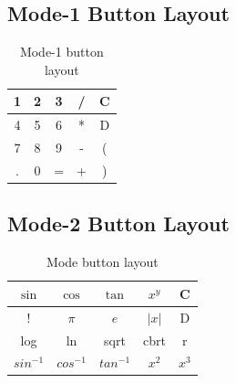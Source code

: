 \documentclass[a4paper,12pt]{article}
\begin{document}
\subsection{Mode-1 Button Layout}
\begin{table}[h]
    \centering
    \begin{tabular}{|c|c|c|c|c|}
        \hline
        1 & 2 & 3 & / & C \\
        \hline
        4 & 5 & 6 & * & D \\
        \hline
        7 & 8 & 9 & - & ( \\
        \hline
               . & 0 & = & + & ) \\
        \hline
    \end{tabular}
    \caption{Mode-1 button layout}
    \label{tab:normal_buttons}
\end{table}

\subsection{Mode-2 Button Layout}
\begin{table}[h]
    \centering
    \begin{tabular}{|c|c|c|c|c|}
        \hline
        $\sin$ & $\cos$ & $\tan$ & $x^y$ & C \\
        \hline
        ! & $\pi$ & $e$ & $|x|$ & D \\
        \hline
        log & ln & sqrt & cbrt & r \\
        \hline
        $sin^{-1}$ & $cos^{-1}$ & $tan^{-1}$ & $x^2$ & $x^3$ \\
        \hline
    \end{tabular}
    \caption{Mode button layout}
    \label{tab:shift_buttons}
\end{table}

\newpage
\end{document}
